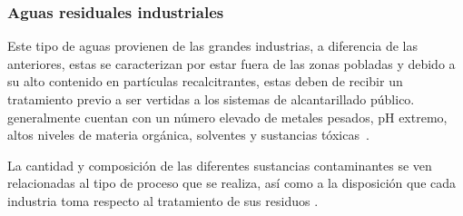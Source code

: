 \subsubsection{Aguas residuales industriales}
Este tipo de aguas provienen de las grandes industrias, a diferencia de las anteriores, estas se caracterizan por estar fuera de las zonas pobladas y debido a su alto contenido en partículas recalcitrantes, estas deben de recibir un tratamiento previo a ser vertidas a los sistemas de alcantarillado público. generalmente cuentan con un número elevado de metales pesados, pH extremo, altos niveles de materia orgánica, solventes y sustancias tóxicas~\citep{lazcano2016}.\par
La cantidad y composición de las diferentes sustancias contaminantes se ven relacionadas al tipo de proceso que se realiza, así como a la disposición que cada industria toma respecto al tratamiento de sus residuos \citep{Hanchang2009}.\par

